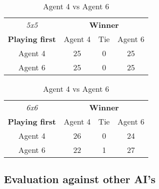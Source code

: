 \begin{table}[!h]
	\centering
	\label{result:Ag4vsAg6}
	\begin{tabular}{c | c | c | c}
		\textit{5x5} & \multicolumn{3}{c}{\textbf{Winner}}        \\
		\textbf{Playing first} & Agent 4 & Tie & Agent 6 \\ \hline
		Agent 4 & 25 & 0 & 25 \\ \hline
		Agent 6 & 25 & 0 & 25
	\end{tabular}
	\quad
	\begin{tabular}{c | c | c | c}
		\textit{6x6} & \multicolumn{3}{c}{\textbf{Winner}}        \\
		\textbf{Playing first} & Agent 4 & Tie & Agent 6 \\ \hline
		Agent 4 & 26 & 0 & 24 \\ \hline
		Agent 6 & 22 & 1 & 27
	\end{tabular}
	\caption{Agent 4 vs Agent 6}
\end{table}


\subsection{Evaluation against other AI's}
